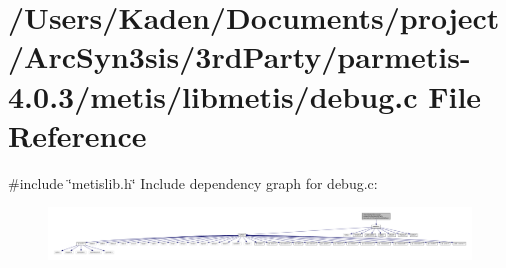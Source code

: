 \hypertarget{a00882}{}\section{/\+Users/\+Kaden/\+Documents/project/\+Arc\+Syn3sis/3rd\+Party/parmetis-\/4.0.3/metis/libmetis/debug.c File Reference}
\label{a00882}
{\ttfamily \#include \char`\"{}metislib.\+h\char`\"{}}\newline
Include dependency graph for debug.\+c\+:\nopagebreak
\begin{figure}[H]
\begin{center}
\leavevmode
\includegraphics[width=350pt]{a00883}
\end{center}
\end{figure}
